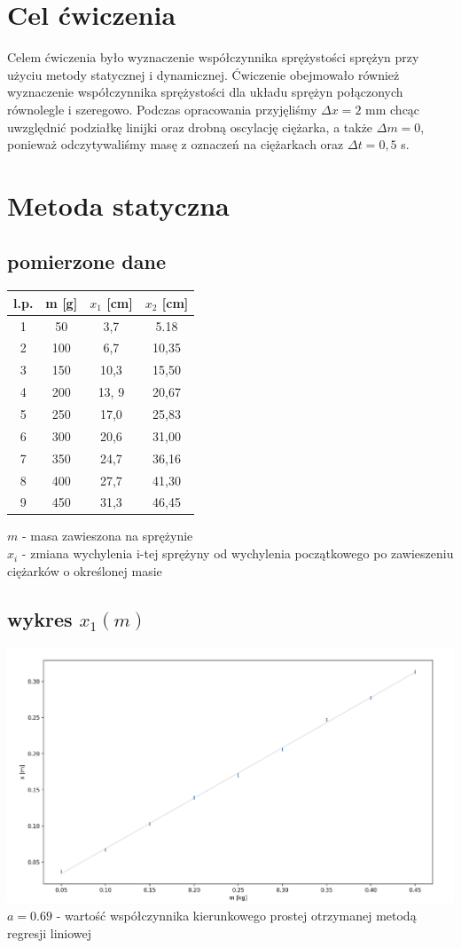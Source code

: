 \documentclass{article}
\begin{document}
\section{Cel ćwiczenia}
Celem ćwiczenia było wyznaczenie współczynnika sprężystości sprężyn przy użyciu metody statycznej i dynamicznej.  Ćwiczenie obejmowało również wyznaczenie współczynnika sprężystości dla układu sprężyn połączonych równolegle i szeregowo. Podczas opracowania przyjęliśmy $\Delta x = 2$ mm chcąc uwzględnić podziałkę linijki oraz drobną oscylację ciężarka, a także $\Delta m = 0$, 
ponieważ odczytywaliśmy masę z oznaczeń na ciężarkach oraz $\Delta t = 0,5 $ s.

\section{Metoda statyczna}
\subsection{pomierzone dane}
\begin{center}
\begin{tabular}{ c | c | c | c}
l.p. & m [g] & $x_1$ [cm] & $x_2$ [cm]\\
\hline
 1    & 50 & 3,7 & 5.18\\ 
 2    & 100 & 6,7 & 10,35\\ 
 3  & 150 & 10,3 & 15,50\\ 
 4  & 200 & 13, 9 & 20,67\\
 5   & 250 & 17,0 &25,83\\
 6  & 300 & 20,6 & 31,00\\
 7  & 350 & 24,7 & 36,16\\
 8  & 400 & 27,7 & 41,30\\
 9  & 450 & 31,3 & 46,45

\end{tabular}
\end{center}
$m$ - masa zawieszona na sprężynie \\
$x_i$ - zmiana wychylenia i-tej sprężyny od wychylenia początkowego po zawieszeniu ciężarków o określonej masie

\subsection{wykres $x_1(m)$}
\includegraphics[width=15cm]{m7_1}\\
 $a = 0.69$  - wartość współczynnika kierunkowego prostej otrzymanej metodą regresji liniowej
\end{document}
